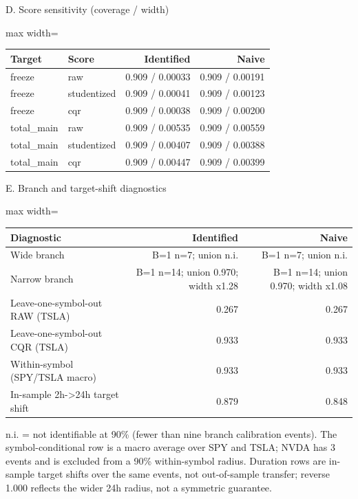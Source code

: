 \begin{table}[!ht]
\par\noindent\begin{minipage}{\linewidth}\raggedright{\scriptsize D. Score sensitivity (coverage / width)}\end{minipage}\par

\begin{adjustbox}{max width=\linewidth}
\begin{tabular}{@{}llrr@{}}
\toprule
Target & Score & Identified & Naive \\
\midrule
freeze & raw & 0.909 / 0.00033 & 0.909 / 0.00191 \\
freeze & studentized & 0.909 / 0.00041 & 0.909 / 0.00123 \\
freeze & cqr & 0.909 / 0.00038 & 0.909 / 0.00200 \\
total\_main & raw & 0.909 / 0.00535 & 0.909 / 0.00559 \\
total\_main & studentized & 0.909 / 0.00407 & 0.909 / 0.00388 \\
total\_main & cqr & 0.909 / 0.00447 & 0.909 / 0.00399 \\
\bottomrule
\end{tabular}
\end{adjustbox}
\vspace{0.5em}
\par\noindent\begin{minipage}{\linewidth}\raggedright{\scriptsize E. Branch and target-shift diagnostics}\end{minipage}\par

\begin{adjustbox}{max width=\linewidth}
\begin{tabular}{@{}lrr@{}}
\toprule
Diagnostic & Identified & Naive \\
\midrule
Wide branch & B=1 n=7; union n.i. & B=1 n=7; union n.i. \\
Narrow branch & B=1 n=14; union 0.970; width x1.28 & B=1 n=14; union 0.970; width x1.08 \\
Leave-one-symbol-out RAW (TSLA) & 0.267 & 0.267 \\
Leave-one-symbol-out CQR (TSLA) & 0.933 & 0.933 \\
Within-symbol (SPY/TSLA macro) & 0.933 & 0.933 \\
In-sample 2h-\textgreater{}24h target shift & 0.879 & 0.848 \\
\bottomrule
\end{tabular}
\end{adjustbox}
\vspace{0.5em}
\par\noindent\begin{minipage}{\linewidth}\raggedright{\scriptsize n.i. = not identifiable at 90\% (fewer than nine branch calibration events). The symbol-conditional row is a macro average over SPY and TSLA; NVDA has 3 events and is excluded from a 90\% within-symbol radius. Duration rows are in-sample target shifts over the same events, not out-of-sample transfer; reverse 1.000 reflects the wider 24h radius, not a symmetric guarantee.}\end{minipage}\par


\end{table}
